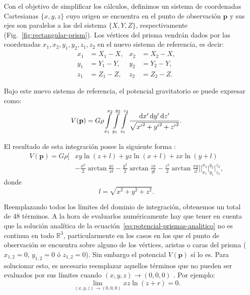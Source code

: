 Con el objetivo de simplificar los cálculos, definimos un sistema de
coordenadas Cartesianas $\{x, y, z\}$ cuyo origen se encuentra en el punto de
observación $\mathbf{p}$ y sus ejes son paralelos a los del sistema $\{X, Y,
Z\}$, respectivamente (Fig.~\ref{fig:rectangular-prism}).
Los vértices del prisma vendrán dados por las coordenadas
$x_1, x_2, y_1, y_2, z_1, z_2$ en el nuevo sistema de referencia, es decir:
%
\begin{equation}
    \begin{aligned}
        x_1 &= X_1 - X, & x_2 &= X_2 - X, \\
        y_1 &= Y_1 - Y, & y_2 &= Y_2 - Y, \\
        z_1 &= Z_1 - Z, & z_2 &= Z_2 - Z.
    \end{aligned}
\end{equation}

Bajo este nuevo sistema de referencia, el potencial gravitatorio se puede
expresar como:
%
\begin{equation}
    V(\mathbf{p}) =
    G \rho
    \int\limits_{x_1}^{x_2}
    \int\limits_{y_1}^{y_2}
    \int\limits_{z_1}^{z_2}
    \frac{\mathop{}\!\textnormal{d} x' \mathop{}\!\textnormal{d} y' \mathop{}\!\textnormal{d} z'}{\sqrt{{x'}^2 + {y'}^2 + {z'}^2}}.
\end{equation}

El resultado de esta integración posee la siguiente forma
\citep{nagy2000,nagy2002}:
%
\begin{equation}
    \begin{split}
        V(\mathbf{p}) =
        G \rho
        \Bigg[ &
            xy \ln (z + l) + yz \ln(x + l) + zx \ln(y + l) \\
               &
            - \frac{x^2}{2} \arctan \frac{yz}{xl}
            - \frac{y^2}{2} \arctan \frac{zx}{yl}
            - \frac{z^2}{2} \arctan \frac{xy}{zl}
        \Bigg]
        \Bigg|_{x_1}^{x_2}
        \Bigg|_{y_1}^{y_2}
        \Bigg|_{z_1}^{z_2},
    \end{split}
    \label{eq:potencial-prismas-analitico}
\end{equation}
%
donde
%
\begin{equation}
    l = \sqrt{x^2 + y^2 + z^2}.
\end{equation}

Reemplazando todos los límites del dominio de integración, obtenemos un total
de 48 términos.
A la hora de evaluarlos numéricamente hay que tener en cuenta que la solución
analítica de la ecuación~\ref{eq:potencial-prismas-analitico} no es
continua en todo $\mathbb{R}^3$, particularmente en los casos en los que el
punto de observación se encuentra sobre alguno de los vértices, aristas o caras
del prisma ($x_{1,2}=0$, $y_{1,2}=0$ ó $z_{1,2}=0$). Sin embargo el potencial
$V(\mathbf{p})$ sí lo es.
Para solucionar esto, es necesario reemplazar aquellos términos que no pueden
ser evaluados por sus límites cuando $(x, y, z) \rightarrow (0, 0, 0)$
\citep{nagy2000}.
Por ejemplo:
%
\begin{equation}
    \lim_{(x, y, z)\rightarrow (0, 0, 0)} xz \ln(z + r) = 0.
\end{equation}

